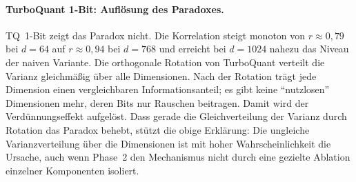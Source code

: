 \paragraph{TurboQuant 1-Bit: Auflösung des Paradoxes.}
TQ~1-Bit zeigt das Paradox nicht.
Die Korrelation steigt monoton von $r \approx 0{,}79$ bei $d = 64$ auf $r \approx 0{,}94$ bei $d = 768$ und erreicht bei $d = 1024$ nahezu das Niveau der naiven Variante.
Die orthogonale Rotation von TurboQuant verteilt die Varianz gleichmäßig über alle Dimensionen.
Nach der Rotation trägt jede Dimension einen vergleichbaren Informationsanteil; es gibt keine \enquote{nutzlosen} Dimensionen mehr, deren Bits nur Rauschen beitragen.
Damit wird der Verdünnungseffekt aufgelöst.
Dass gerade die Gleichverteilung der Varianz durch Rotation das Paradox behebt, stützt die obige Erklärung: Die ungleiche Varianzverteilung über die Dimensionen ist mit hoher Wahrscheinlichkeit die Ursache, auch wenn Phase~2 den Mechanismus nicht durch eine gezielte Ablation einzelner Komponenten isoliert.
%
